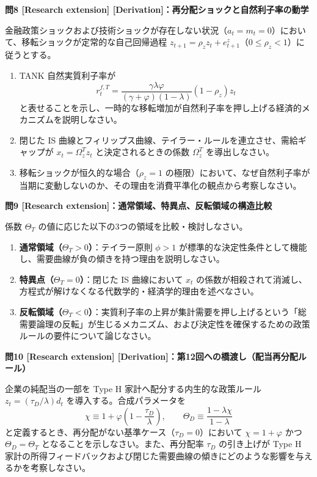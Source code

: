 \documentclass[
  japanese,
  lualatex,
  ja=standard,
  12pt,
  a4paper]{ltjsarticle}
\providecommand{\tightlist}{%
  \setlength{\itemsep}{0pt}\setlength{\parskip}{0pt}}
\begin{document}
\textbf{問8 {[}Research extension{]}
{[}Derivation{]}：再分配ショックと自然利子率の動学}

金融政策ショックおよび技術ショックが存在しない状況（\(a_t = m_t = 0\)）において、移転ショックが定常的な自己回帰過程
\(z_{t+1} = \rho_z z_t + e_{t+1}^z\)（\(0 \leq \rho_z < 1\)）に従うとする。

\begin{enumerate}
\def\labelenumi{\arabic{enumi}.}
\tightlist
\item
  TANK 自然実質利子率が \[
  r_t^{f,T} = \frac{\gamma \lambda \varphi}{(\gamma+\varphi)(1-\lambda)} (1 - \rho_z) z_t
  \]
  と表せることを示し、一時的な移転増加が自然利子率を押し上げる経済的メカニズムを説明しなさい。
\item
  閉じた IS
  曲線とフィリップス曲線、テイラー・ルールを連立させ、需給ギャップが
  \(x_t = \Omega_z^T z_t\) と決定されるときの係数 \(\Omega_z^T\)
  を導出しなさい。
\item
  移転ショックが恒久的な場合（\(\rho_z = 1\)
  の極限）において、なぜ自然利子率が当期に変動しないのか、その理由を消費平準化の観点から考察しなさい。
\end{enumerate}


\textbf{問9 {[}Research
extension{]}：通常領域、特異点、反転領域の構造比較}

係数 \(\Theta_T\) の値に応じた以下の3つの領域を比較・検討しなさい。

\begin{enumerate}
\def\labelenumi{\arabic{enumi}.}
\tightlist
\item
  \textbf{通常領域（\(\Theta_T > 0\)）}：テイラー原則 \(\phi>1\)
  が標準的な決定性条件として機能し、需要曲線が負の傾きを持つ理由を説明しなさい。
\item
  \textbf{特異点（\(\Theta_T = 0\)）}：閉じた IS 曲線において \(x_t\)
  の係数が相殺されて消滅し、方程式が解けなくなる代数学的・経済学的理由を述べなさい。
\item
  \textbf{反転領域（\(\Theta_T < 0\)）}：実質利子率の上昇が集計需要を押し上げるという「総需要論理の反転」が生じるメカニズム、および決定性を確保するための政策ルールの要件について論じなさい。
\end{enumerate}


\textbf{問10 {[}Research extension{]}
{[}Derivation{]}：第12回への橋渡し（配当再分配ルール）}

企業の純配当の一部を Type H 家計へ配分する内生的な政策ルール
\(z_t = (\tau_D / \lambda) d_t\) を導入する。合成パラメータを \[
\chi \equiv 1 + \varphi\left( 1 - \frac{\tau_D}{\lambda} \right),
\qquad
\Theta_D \equiv \frac{1 - \lambda \chi}{1-\lambda}
\] と定義するとき、再分配がない基準ケース（\(\tau_D = 0\)）において
\(\chi = 1+\varphi\) かつ \(\Theta_D = \Theta_T\)
となることを示しなさい。また、再分配率 \(\tau_D\) の引き上げが Type H
家計の所得フィードバックおよび閉じた需要曲線の傾きにどのような影響を与えるかを考察しなさい。
\end{document}
